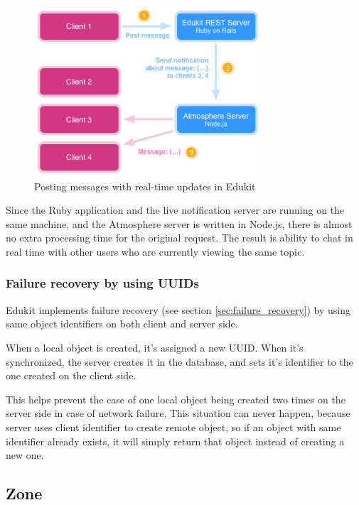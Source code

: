 \begin{figure}[htbp]
  \centering
    \includegraphics[height=2.5in]{figures/EdukitMessages.png}
  \caption{Posting messages with real-time updates in Edukit}
  \label{fig:figures_EdukitMessages}
\end{figure}


Since the Ruby application and the live notification server are running on the same machine, and the Atmosphere server is written in Node.js, there is almost no extra processing time for the original request. The result is ability to chat in real time with other users who are currently viewing the same topic.

\subsubsection{Failure recovery by using UUIDs}

Edukit implements failure recovery (see section \ref{sec:failure_recovery}) by using same object identifiers on both client and server side.

When a local object is created, it's assigned a new UUID. When it's synchronized, the server creates it in the database, and sets it's identifier to the one created on the client side.

This helps prevent the case of one local object being created two times on the server side in case of network failure. This situation can never happen, because server uses client identifier to create remote object, so if an object with same identifier already exists, it will simply return that object instead of creating a new one.

\subsection{Zone}


